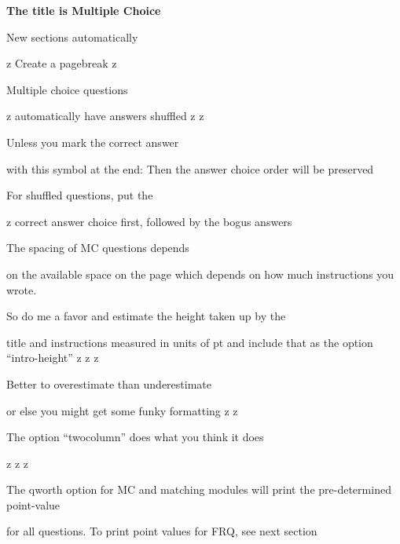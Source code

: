 \documentclass{exam}
\begin{document}
\newpage
\par\noindent \textbf{\large  The title is Multiple Choice}
\setlength{\columnsep}{0.40 in}
\begin{multicols*}{2}
\renewcommand{\choiceshook}{\setlength{\leftmargin}{0.40 in}}
\renewcommand{\questionshook}{\setlength{\leftmargin}{0.0 in}}
\begin{questions}
\setcounter{question}{19}
	\question[2] New sections automatically
	\begin{choices}
		\choice z
		\CorrectChoice Create a pagebreak
		\choice z
	\end{choices}
	\question[2] Multiple choice questions
	\begin{choices}
		\choice z
		\CorrectChoice automatically have answers shuffled
		\choice z
		\choice z
	\end{choices}
	\question[2] Unless you mark the correct answer
	\begin{choices}
		\CorrectChoice with this symbol at the end:
		\choice Then the answer choice order
		\choice will be
		\choice preserved
	\end{choices}
	\question[2] For shuffled questions, put the
	\begin{choices}
		\choice z
		\CorrectChoice correct answer choice first,
		\choice followed by the bogus answers
	\end{choices}
	\question[2] The spacing of MC questions depends
	\begin{choices}
		\choice on the available space on the page
		\CorrectChoice which depends on how much instructions you wrote.
	\end{choices}
	\question[2] So do me a favor and estimate the height taken up by the
	\begin{choices}
		\choice title and instructions
		\CorrectChoice measured in units of pt
		\choice and include that as the option ``intro-height''
		\choice z
		\choice z
		\choice z
	\end{choices}
	\question[2] Better to overestimate than underestimate
	\begin{choices}
		\CorrectChoice or else you might get some funky formatting
		\choice z
		\choice z
	\end{choices}
	\vfill\null\columnbreak
	\question[2] The option ``twocolumn'' does what you think it does
	\begin{choices}
		\CorrectChoice z
		\CorrectChoice z
		\CorrectChoice z
	\end{choices}
	\question[2] The qworth option for MC and matching modules will print the pre-determined point-value
	\begin{choices}
		\CorrectChoice for all questions.
		\choice To print point values for FRQ, see next section
	\end{choices}
\end{questions}
\end{multicols*}
\renewcommand{\choiceshook}{}
\renewcommand{\questionshook}{}
\end{document}
